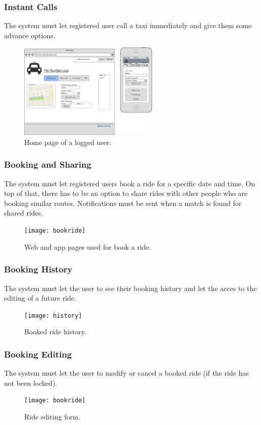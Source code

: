 		\subsubsection {Instant Calls}
			The system must let registered user call a taxi immediately and give them some advance options.
			\begin{figure}[h!]
				\includegraphics[width=0.6\textwidth]{homelog}
				\caption{Home page of a logged user.}
			\end{figure}
			\newpage
		\subsubsection {Booking and Sharing}
			The system must let registered users book a ride for a specific date and time. On top of that, there has to be an option to share
			rides with other people who are booking similar routes. Notifications must be sent when a match is found for shared rides.
			\begin{figure}[h!]
				\texttt{[image: bookride]}
				\caption{Web and app pages used for book a ride.}
			\end{figure}
			\newpage
		\subsubsection {Booking History}
			The system must let the user to see their booking history and let the acces to the editing of a future ride.
			\begin{figure}[h!]
				\texttt{[image: history]}
				\caption{Booked ride history.}
			\end{figure}
		\subsubsection {Booking Editing}
			The system must let the user to modify or cancel a booked ride (if the ride has not been locked).
			\begin{figure}[h!]
				\texttt{[image: bookride]}
				\caption{Ride editing form.}
			\end{figure}
			\newpage




